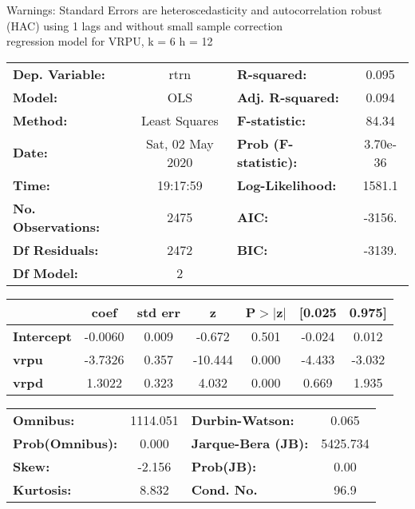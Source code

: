 Warnings: \newline
 [1] Standard Errors are heteroscedasticity and autocorrelation robust (HAC) using 1 lags and without small sample correction\\ 

regression model for VRPU, k = 6 h = 12\begin{center}
\begin{tabular}{lclc}
\toprule
\textbf{Dep. Variable:}    &       rtrn       & \textbf{  R-squared:         } &     0.095   \\
\textbf{Model:}            &       OLS        & \textbf{  Adj. R-squared:    } &     0.094   \\
\textbf{Method:}           &  Least Squares   & \textbf{  F-statistic:       } &     84.34   \\
\textbf{Date:}             & Sat, 02 May 2020 & \textbf{  Prob (F-statistic):} &  3.70e-36   \\
\textbf{Time:}             &     19:17:59     & \textbf{  Log-Likelihood:    } &    1581.1   \\
\textbf{No. Observations:} &        2475      & \textbf{  AIC:               } &    -3156.   \\
\textbf{Df Residuals:}     &        2472      & \textbf{  BIC:               } &    -3139.   \\
\textbf{Df Model:}         &           2      & \textbf{                     } &             \\
\bottomrule
\end{tabular}
\begin{tabular}{lcccccc}
                   & \textbf{coef} & \textbf{std err} & \textbf{z} & \textbf{P$> |$z$|$} & \textbf{[0.025} & \textbf{0.975]}  \\
\midrule
\textbf{Intercept} &      -0.0060  &        0.009     &    -0.672  &         0.501        &       -0.024    &        0.012     \\
\textbf{vrpu}      &      -3.7326  &        0.357     &   -10.444  &         0.000        &       -4.433    &       -3.032     \\
\textbf{vrpd}      &       1.3022  &        0.323     &     4.032  &         0.000        &        0.669    &        1.935     \\
\bottomrule
\end{tabular}
\begin{tabular}{lclc}
\textbf{Omnibus:}       & 1114.051 & \textbf{  Durbin-Watson:     } &    0.065  \\
\textbf{Prob(Omnibus):} &   0.000  & \textbf{  Jarque-Bera (JB):  } & 5425.734  \\
\textbf{Skew:}          &  -2.156  & \textbf{  Prob(JB):          } &     0.00  \\
\textbf{Kurtosis:}      &   8.832  & \textbf{  Cond. No.          } &     96.9  \\
\bottomrule
\end{tabular}
\end{center}

